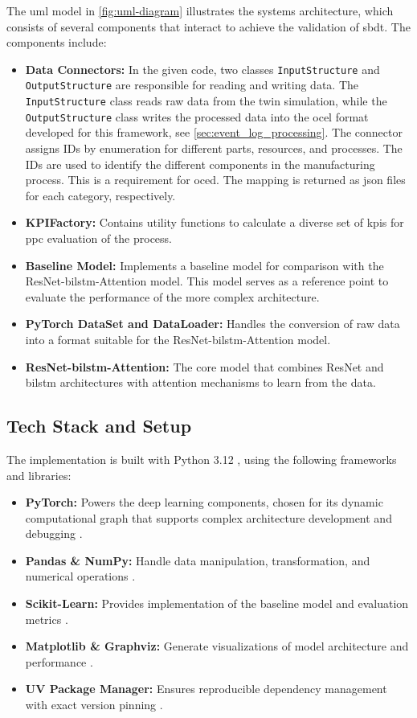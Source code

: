 The \gls{uml} model \autocite{PlantUML} in \autoref{fig:uml-diagram} illustrates the systems architecture, which consists of several components that interact to achieve the validation of \gls{sbdt}. The components include:
\begin{itemize}
  \item \textbf{Data Connectors:} In the given code, two classes \texttt{InputStructure} and \texttt{OutputStructure} are responsible for reading and writing data. The \texttt{InputStructure} class reads raw data from the twin simulation, while the \texttt{OutputStructure} class writes the processed data into the \gls{ocel} format developed for this framework, see \autoref{sec:event_log_processing}. The connector assigns IDs by enumeration for different parts, resources, and processes. The IDs are used to identify the different components in the manufacturing process. This is a requirement for \gls{oced}. The mapping is returned as \gls{json} files for each category, respectively.
  \item \textbf{KPIFactory:} Contains utility functions to calculate a diverse set of \gls{kpi}s for \gls{ppc} evaluation of the process.
  \item \textbf{Baseline Model:} Implements a baseline model for comparison with the ResNet-\gls{bilstm}-Attention model. This model serves as a reference point to evaluate the performance of the more complex architecture.
  \item \textbf{PyTorch DataSet and DataLoader:} Handles the conversion of raw data into a format suitable for the ResNet-\gls{bilstm}-Attention model.
  \item \textbf{ResNet-\gls{bilstm}-Attention:} The core model that combines ResNet and \gls{bilstm} architectures with attention mechanisms to learn from the data.
\end{itemize}

\subsection{Tech Stack and Setup}
The implementation is built with Python 3.12 \autocite{Python}, using the following frameworks and libraries:

\begin{itemize}
  \item \textbf{PyTorch:} Powers the deep learning components, chosen for its dynamic computational graph that supports complex architecture development and debugging \autocite{PyTorch}.
  \item \textbf{Pandas \& NumPy:} Handle data manipulation, transformation, and numerical operations \autocite{NumPy, Pandas}.
  \item \textbf{Scikit-Learn:} Provides implementation of the baseline model and evaluation metrics \autocite{Scikit-Learn}.
  \item \textbf{Matplotlib \& Graphviz:} Generate visualizations of model architecture and performance \autocite{Matplotlib, Graphviz}.
  \item \textbf{UV Package Manager:} Ensures reproducible dependency management with exact version pinning \autocite{UV}.
\end{itemize}

